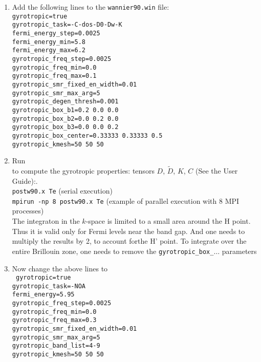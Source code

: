 \documentclass[a4paper,11pt,twoside]{article}
\begin{document}
\begin{enumerate}
\item  Add the following lines to the {\tt wannier90.win} file:\\
{\tt gyrotropic=true  \\
gyrotropic\_task=-C-dos-D0-Dw-K \\
fermi\_energy\_step=0.0025\\
fermi\_energy\_min=5.8\\
fermi\_energy\_max=6.2\\
gyrotropic\_freq\_step=0.0025\\
gyrotropic\_freq\_min=0.0\\
gyrotropic\_freq\_max=0.1\\
gyrotropic\_smr\_fixed\_en\_width=0.01\\
gyrotropic\_smr\_max\_arg=5\\
gyrotropic\_degen\_thresh=0.001\\
gyrotropic\_box\_b1=0.2 0.0 0.0\\
gyrotropic\_box\_b2=0.0 0.2 0.0\\
gyrotropic\_box\_b3=0.0 0.0 0.2\\
gyrotropic\_box\_center=0.33333 0.33333 0.5\\
gyrotropic\_kmesh=50 50 50
}



\item Run \postw\ \\to compute the gyrotropic properties: tensors $D$, $\widetilde{D}$, $K$, $C$ (See the User Guide):.\\
  {\tt postw90.x Te} (serial execution)\\
  {\tt mpirun -np 8 postw90.x Te} (example of parallel execution with
  8 MPI processes) \\


The integraton in the $k$-space is limited to a small area around the H point. Thus it is valid only for Fermi levels near the band gap. 
And one needs to multiply the results by 2, to account forthe H' point. To integrate over the entire Brillouin zone, one needs to remove the 
{\tt gyrotropic\_box\_$\ldots$} parameters

\item Now change the above lines to \\ {\tt
gyrotropic=true\\
gyrotropic\_task=-NOA\\
fermi\_energy=5.95\\
gyrotropic\_freq\_step=0.0025\\
gyrotropic\_freq\_min=0.0\\
gyrotropic\_freq\_max=0.3\\
gyrotropic\_smr\_fixed\_en\_width=0.01\\
gyrotropic\_smr\_max\_arg=5\\
gyrotropic\_band\_list=4-9\\
gyrotropic\_kmesh=50 50 50\\
}


\end{enumerate}
\end{document}
